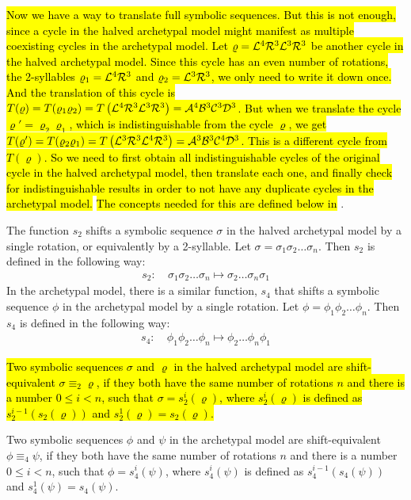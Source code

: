 \hl{
	Now we have a way to translate full symbolic sequences.
	But this is not enough, since a cycle in the halved archetypal model might manifest as multiple coexisting cycles in the archetypal model.
	Let $\varrho = \mathcal{L}^4\mathcal{R}^3\mathcal{L}^3\mathcal{R}^3$ be another cycle in the halved archetypal model.
	Since this cycle has an even number of rotations, the 2-syllables $\varrho_1 = \mathcal{L}^4\mathcal{R}^3$ and $\varrho_2 = \mathcal{L}^3\mathcal{R}^3$, we only need to write it down once.
	And the translation of this cycle is $T(\varrho) = T(\varrho_1\varrho_2) = T\left(\mathcal{L}^4\mathcal{R}^3\mathcal{L}^3\mathcal{R}^3\right) = \mathcal{A}^4\mathcal{B}^3\mathcal{C}^3\mathcal{D}^3$.
	But when we translate the cycle $\varrho' = \varrho_2\varrho_1$, which is indistinguishable from the cycle $\varrho$, we get $T(\varrho') = T(\varrho_2\varrho_1) = T\left(\mathcal{L}^3\mathcal{R}^3\mathcal{L}^4\mathcal{R}^3\right) = \mathcal{A}^3\mathcal{B}^3\mathcal{C}^4\mathcal{D}^3$.
	This is a different cycle from $T(\varrho)$.
	So we need to first obtain all indistinguishable cycles of the original cycle in the halved archetypal model, then translate each one, and finally check for indistinguishable results in order to not have any duplicate cycles in the archetypal model.
}
\hl{The concepts needed for this are defined below in} .

\begin{definition}
	\label{def:shifting}
	The function $s_2$ shifts a symbolic sequence $\sigma$ in the halved archetypal model by a single rotation, or equivalently by a 2-syllable.
	Let $\sigma = \sigma_1\sigma_2 \dots \sigma_n$.
	Then $s_2$ is defined in the following way:
	\begin{align}
		s_2:\: & \sigma_1\sigma_2 \dots \sigma_n \mapsto \sigma_2 \dots \sigma_n\sigma_1
	\end{align}
	In the archetypal model, there is a similar function, $s_4$ that shifts a symbolic sequence $\phi$ in the archetypal model by a single rotation.
	Let $\phi = \phi_1\phi_2 \dots \phi_n$.
	Then $s_4$ is defined in the following way:
	\begin{align}
		s_4:\: & \phi_1\phi_2 \dots \phi_n \mapsto \phi_2 \dots \phi_n\phi_1
	\end{align}
\end{definition}

\begin{definition}
	\label{def:shift.equiv}
	\hl{
	Two symbolic sequences $\sigma$ and $\varrho$ in the halved archetypal model are shift-equivalent $\sigma \equiv_2 \varrho$,
	if they both have the same number of rotations $n$
	and there is a number $0 \leq i < n$, such that $\sigma = s_2^i(\varrho)$,
	where $s_2^i(\varrho)$ is defined as $s_2^{i-1}(s_2(\varrho))$ and $s_2^1(\varrho) = s_2(\varrho)$.
	}

	Two symbolic sequences $\phi$ and $\psi$ in the archetypal model are shift-equivalent $\phi \equiv_4 \psi$,
	if they both have the same number of rotations $n$
	and there is a number $0 \leq i < n$, such that $\phi = s_4^i(\psi)$,
	where $s_4^i(\psi)$ is defined as $s_4^{i-1}(s_4(\psi))$ and $s_4^1(\psi) = s_4(\psi)$.
\end{definition}

